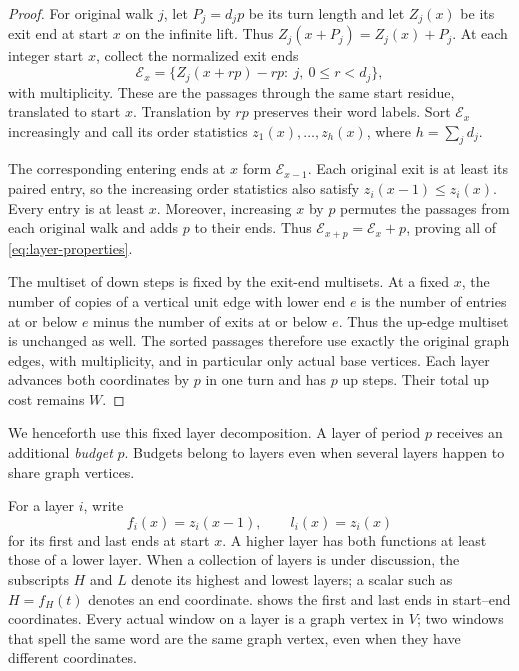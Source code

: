 \begin{proof}
For original walk $j$, let $P_j=d_jp$ be its turn length and let $Z_j(x)$ be its exit end at start $x$ on the infinite lift. Thus $Z_j(x+P_j)=Z_j(x)+P_j$. At each integer start $x$, collect the normalized exit ends
\[
\mathcal E_x=
\bigl\{Z_j(x+rp)-rp:\ j,\ 0\le r<d_j\bigr\},
\]
with multiplicity. These are the passages through the same start residue, translated to start $x$. Translation by $rp$ preserves their word labels. Sort $\mathcal E_x$ increasingly and call its order statistics $z_1(x),\ldots,z_h(x)$, where $h=\sum_j d_j$.

The corresponding entering ends at $x$ form $\mathcal E_{x-1}$. Each original exit is at least its paired entry, so the increasing order statistics also satisfy $z_i(x-1)\le z_i(x)$. Every entry is at least $x$. Moreover, increasing $x$ by $p$ permutes the passages from each original walk and adds $p$ to their ends. Thus $\mathcal E_{x+p}=\mathcal E_x+p$, proving all of \eqref{eq:layer-properties}.

The multiset of down steps is fixed by the exit-end multisets. At a fixed $x$, the number of copies of a vertical unit edge with lower end $e$ is the number of entries at or below $e$ minus the number of exits at or below $e$. Thus the up-edge multiset is unchanged as well. The sorted passages therefore use exactly the original graph edges, with multiplicity, and in particular only actual base vertices. Each layer advances both coordinates by $p$ in one turn and has $p$ up steps. Their total up cost remains $W$.
\end{proof}

We henceforth use this fixed layer decomposition. A layer of period $p$ receives an additional \emph{budget} $p$. Budgets belong to layers even when several layers happen to share graph vertices.

For a layer $i$, write
\begin{equation}\label{eq:first-last}
f_i(x)=z_i(x-1),\qquad l_i(x)=z_i(x)
\end{equation}
for its first and last ends at start $x$. A higher layer has both functions at least those of a lower layer. When a collection of layers is under discussion, the subscripts $H$ and $L$ denote its highest and lowest layers; a scalar such as $H=f_H(t)$ denotes an end coordinate.  shows the first and last ends in start--end coordinates. Every actual window on a layer is a graph vertex in $V$; two windows that spell the same word are the same graph vertex, even when they have different coordinates.

